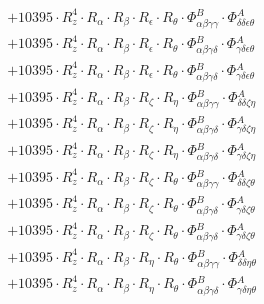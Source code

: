 \documentclass{article}
\begin{document}
\begin{subequations}
\begin{gather}
\begin{array}{c}
 \\[0.2em] 		 + 10395 \cdot R_{z}^{4} \cdot R_{\alpha{}} \cdot R_{\beta{}} \cdot R_{\epsilon{}} \cdot R_{\theta{}} \cdot \Phi{}^{B}_{\alpha{}\beta{}\gamma{}\gamma{}} \cdot \Phi{}^{A}_{\delta{}\delta{}\epsilon{}\theta{}} 
 \\[0.2em] 		 + 10395 \cdot R_{z}^{4} \cdot R_{\alpha{}} \cdot R_{\beta{}} \cdot R_{\epsilon{}} \cdot R_{\theta{}} \cdot \Phi{}^{B}_{\alpha{}\beta{}\gamma{}\delta{}} \cdot \Phi{}^{A}_{\gamma{}\delta{}\epsilon{}\theta{}} 
 \\[0.2em] 		 + 10395 \cdot R_{z}^{4} \cdot R_{\alpha{}} \cdot R_{\beta{}} \cdot R_{\epsilon{}} \cdot R_{\theta{}} \cdot \Phi{}^{B}_{\alpha{}\beta{}\gamma{}\delta{}} \cdot \Phi{}^{A}_{\gamma{}\delta{}\epsilon{}\theta{}} 
 \\[0.2em] 		 + 10395 \cdot R_{z}^{4} \cdot R_{\alpha{}} \cdot R_{\beta{}} \cdot R_{\zeta{}} \cdot R_{\eta{}} \cdot \Phi{}^{B}_{\alpha{}\beta{}\gamma{}\gamma{}} \cdot \Phi{}^{A}_{\delta{}\delta{}\zeta{}\eta{}} 
 \\[0.2em] 		 + 10395 \cdot R_{z}^{4} \cdot R_{\alpha{}} \cdot R_{\beta{}} \cdot R_{\zeta{}} \cdot R_{\eta{}} \cdot \Phi{}^{B}_{\alpha{}\beta{}\gamma{}\delta{}} \cdot \Phi{}^{A}_{\gamma{}\delta{}\zeta{}\eta{}} 
 \\[0.2em] 		 + 10395 \cdot R_{z}^{4} \cdot R_{\alpha{}} \cdot R_{\beta{}} \cdot R_{\zeta{}} \cdot R_{\eta{}} \cdot \Phi{}^{B}_{\alpha{}\beta{}\gamma{}\delta{}} \cdot \Phi{}^{A}_{\gamma{}\delta{}\zeta{}\eta{}} 
 \\[0.2em] 		 + 10395 \cdot R_{z}^{4} \cdot R_{\alpha{}} \cdot R_{\beta{}} \cdot R_{\zeta{}} \cdot R_{\theta{}} \cdot \Phi{}^{B}_{\alpha{}\beta{}\gamma{}\gamma{}} \cdot \Phi{}^{A}_{\delta{}\delta{}\zeta{}\theta{}} 
 \\[0.2em] 		 + 10395 \cdot R_{z}^{4} \cdot R_{\alpha{}} \cdot R_{\beta{}} \cdot R_{\zeta{}} \cdot R_{\theta{}} \cdot \Phi{}^{B}_{\alpha{}\beta{}\gamma{}\delta{}} \cdot \Phi{}^{A}_{\gamma{}\delta{}\zeta{}\theta{}} 
 \\[0.2em] 		 + 10395 \cdot R_{z}^{4} \cdot R_{\alpha{}} \cdot R_{\beta{}} \cdot R_{\zeta{}} \cdot R_{\theta{}} \cdot \Phi{}^{B}_{\alpha{}\beta{}\gamma{}\delta{}} \cdot \Phi{}^{A}_{\gamma{}\delta{}\zeta{}\theta{}} 
 \\[0.2em] 		 + 10395 \cdot R_{z}^{4} \cdot R_{\alpha{}} \cdot R_{\beta{}} \cdot R_{\eta{}} \cdot R_{\theta{}} \cdot \Phi{}^{B}_{\alpha{}\beta{}\gamma{}\gamma{}} \cdot \Phi{}^{A}_{\delta{}\delta{}\eta{}\theta{}} 
 \\[0.2em] 		 + 10395 \cdot R_{z}^{4} \cdot R_{\alpha{}} \cdot R_{\beta{}} \cdot R_{\eta{}} \cdot R_{\theta{}} \cdot \Phi{}^{B}_{\alpha{}\beta{}\gamma{}\delta{}} \cdot \Phi{}^{A}_{\gamma{}\delta{}\eta{}\theta{}} 

\end{array}
\end{gather}
\end{subequations}
\end{document}
